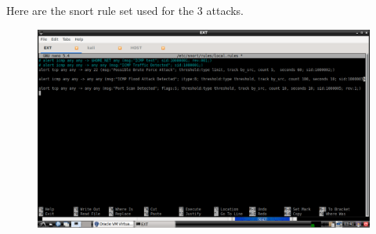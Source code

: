 \documentclass[12pt,a4paper]{report}
\begin{document}
Here are the snort rule set used for the 3 attacks.

\begin{figure}[H]
\includegraphics[scale=.3]{rule config 2.png} 
\end{figure}
\end{document}
